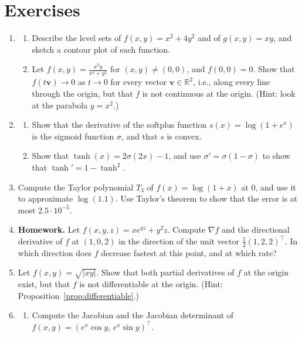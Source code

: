 \documentclass[11pt]{article}
\newcommand{\homework}{\textcolor{red!70!black}{\textbf{Homework.}}}
\theoremstyle{definition}
\theoremstyle{plain}
\theoremstyle{remark}
\begin{document}
\section{Exercises}\label{sec:exercises}
\begin{enumerate}[leftmargin=*]
    \item\label{ex3:level-sets} \begin{enumerate}[label=(\alph*)]
        \item Describe the level sets of $f(x, y) = x^2 + 4y^2$ and of $g(x, y) = xy$, and sketch a contour plot of each function.
        \item Let $f(x, y) = \frac{x^2 y}{x^4 + y^2}$ for $(x, y) \neq (0, 0)$, and $f(0, 0) = 0$. Show that $f(t\mathbf{v}) \to 0$ as $t \to 0$ for every vector $\mathbf{v} \in \mathbb{R}^2$, i.e., along every line through the origin, but that $f$ is not continuous at the origin. (Hint: look at the parabola $y = x^2$.)
    \end{enumerate}
    \item \begin{enumerate}[label=(\alph*)]
        \item Show that the derivative of the softplus function $s(x) = \log(1 + e^x)$ is the sigmoid function $\sigma$, and that $s$ is convex.
        \item Show that $\tanh(x) = 2\sigma(2x) - 1$, and use $\sigma' = \sigma(1 - \sigma)$ to show that $\tanh' = 1 - \tanh^2$.
    \end{enumerate}
    \item Compute the Taylor polynomial $T_3$ of $f(x) = \log(1 + x)$ at $0$, and use it to approximate $\log(1.1)$. Use Taylor's theorem to show that the error is at most $2.5 \cdot 10^{-5}$.
    \item \homework{} Let $f(x, y, z) = x e^{yz} + y^2 z$. Compute $\nabla f$ and the directional derivative of $f$ at $(1, 0, 2)$ in the direction of the unit vector $\frac{1}{3}(1, 2, 2)^\top$. In which direction does $f$ decrease fastest at this point, and at which rate?
    \item Let $f(x, y) = \sqrt{|xy|}$. Show that both partial derivatives of $f$ at the origin exist, but that $f$ is not differentiable at the origin. (Hint: Proposition~\ref{prop:differentiable}.)
    \item \begin{enumerate}[label=(\alph*)]
        \item Compute the Jacobian and the Jacobian determinant of $f(x, y) = (e^x\cos y, \, e^x\sin y)^\top$.

\end{enumerate}
\end{enumerate}
\end{document}
